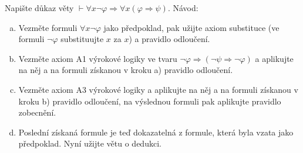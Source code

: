 Napište důkaz věty $\vdash \forall x \neg \varphi \Rightarrow \forall x (\varphi \Rightarrow \psi)$. Návod:
\begin{enumerate}[a)]
	\item Vezměte formuli $\forall x \neg \varphi$ jako předpoklad, pak užijte
    axiom substituce (ve formuli $\neg \varphi$ substituujte $x$ za $x$) a
    pravidlo odloučení.
  \item Vezměte axiom A1 výrokové logiky ve tvaru $\neg \varphi \Rightarrow
    (\neg \psi \Rightarrow \neg \varphi)$ a aplikujte na něj a na formuli
    získanou v kroku a) pravidlo odloučení.
  \item Vezměte axiom A3 výrokové logiky a aplikujte na něj a na formuli
    získanou v kroku b) pravidlo odloučení, na výslednou formuli pak aplikujte
    pravidlo zobecnění.
  \item Poslední získaná formule je teď dokazatelná z formule, která byla vzata
    jako předpoklad. Nyní užijte větu o dedukci.
\end{enumerate}
